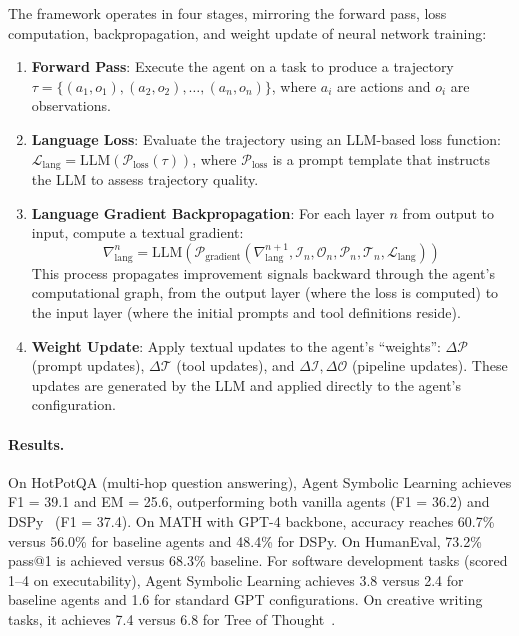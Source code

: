 The framework operates in four stages, mirroring the forward pass, loss computation, backpropagation, and weight update of neural network training:
\begin{enumerate}
    \item \textbf{Forward Pass}: Execute the agent on a task to produce a trajectory $\tau = \{(a_1, o_1), (a_2, o_2), \ldots, (a_n, o_n)\}$, where $a_i$ are actions and $o_i$ are observations.
    \item \textbf{Language Loss}: Evaluate the trajectory using an LLM-based loss function: $\mathcal{L}_{\text{lang}} = \mathrm{LLM}(\mathcal{P}_{\text{loss}}(\tau))$, where $\mathcal{P}_{\text{loss}}$ is a prompt template that instructs the LLM to assess trajectory quality.
    \item \textbf{Language Gradient Backpropagation}: For each layer $n$ from output to input, compute a textual gradient:
    \begin{equation}
        \nabla_{\text{lang}}^n = \mathrm{LLM}\left(\mathcal{P}_{\text{gradient}}\left(\nabla_{\text{lang}}^{n+1}, \mathcal{I}_n, \mathcal{O}_n, \mathcal{P}_n, \mathcal{T}_n, \mathcal{L}_{\text{lang}}\right)\right)
        \label{eq:symbolic-gradient}
    \end{equation}
    This process propagates improvement signals backward through the agent's computational graph, from the output layer (where the loss is computed) to the input layer (where the initial prompts and tool definitions reside).
    \item \textbf{Weight Update}: Apply textual updates to the agent's ``weights'': $\Delta\mathcal{P}$ (prompt updates), $\Delta\mathcal{T}$ (tool updates), and $\Delta\mathcal{I}, \Delta\mathcal{O}$ (pipeline updates). These updates are generated by the LLM and applied directly to the agent's configuration.
\end{enumerate}

\paragraph{Results.}
On HotPotQA (multi-hop question answering), Agent Symbolic Learning achieves F1 = 39.1 and EM = 25.6, outperforming both vanilla agents (F1 = 36.2) and DSPy~\citep{khattab2023dspy} (F1 = 37.4). On MATH with GPT-4 backbone, accuracy reaches 60.7\% versus 56.0\% for baseline agents and 48.4\% for DSPy. On HumanEval, 73.2\% pass@1 is achieved versus 68.3\% baseline. For software development tasks (scored 1--4 on executability), Agent Symbolic Learning achieves 3.8 versus 2.4 for baseline agents and 1.6 for standard GPT configurations. On creative writing tasks, it achieves 7.4 versus 6.8 for Tree of Thought~\citep{yao2023treeofthoughts}.

